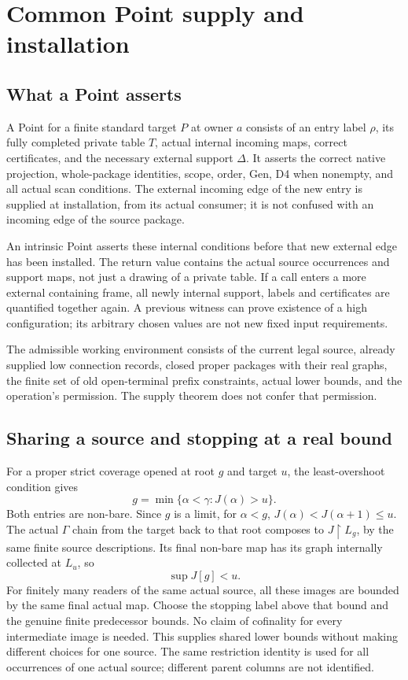 \section{Common Point supply and installation}\label{ch:point}

\subsection{What a Point asserts}
A Point for a finite standard target $P$ at owner $a$ consists of an
entry label $\rho$, its fully completed private table $T$, actual
internal incoming maps, correct certificates, and the necessary
external support $\Delta$. It asserts the correct native projection,
whole-package identities, scope, order, Gen, D4 when nonempty, and
all actual scan conditions. The external incoming edge of the new
entry is supplied at installation, from its actual consumer; it is
not confused with an incoming edge of the source package.

An intrinsic Point asserts these internal conditions before that
new external edge has been installed. The return value contains
the actual source occurrences and support maps, not just a drawing
of a private table. If a call enters a more external containing
frame, all newly internal support, labels and certificates are
quantified together again. A previous witness can prove existence
of a high configuration; its arbitrary chosen values are not new
fixed input requirements.

The admissible working environment consists of the current legal
source, already supplied low connection records, closed proper
packages with their real graphs, the finite set of old open-terminal
prefix constraints, actual lower bounds, and the operation's
permission. The supply theorem does not confer that permission.

\subsection{Sharing a source and stopping at a real bound}
For a proper strict coverage opened at root $g$ and target $u$, the
least-overshoot condition gives
\[
 g=\min\{\alpha<\gamma:J(\alpha)>u\}.
\]
Both entries are non-bare. Since $g$ is a limit, for $\alpha<g$,
$J(\alpha)<J(\alpha+1)\le u$. The actual $\Gamma$ chain from the
target back to that root composes to $J\restriction L_g$, by the
same finite source descriptions. Its final non-bare map has its
graph internally collected at $L_u$, so
\begin{equation}\label{eq:6-1}
                         \sup J[g]<u.                     
\end{equation}
For finitely many readers of the same actual source, all these
images are bounded by the same final actual map. Choose the stopping
label above that bound and the genuine finite predecessor bounds.
No claim of cofinality for every intermediate image is needed.
This supplies shared lower bounds without making different choices
for one source. The same restriction identity is used for all occurrences of one
actual source; different parent columns are not identified.

